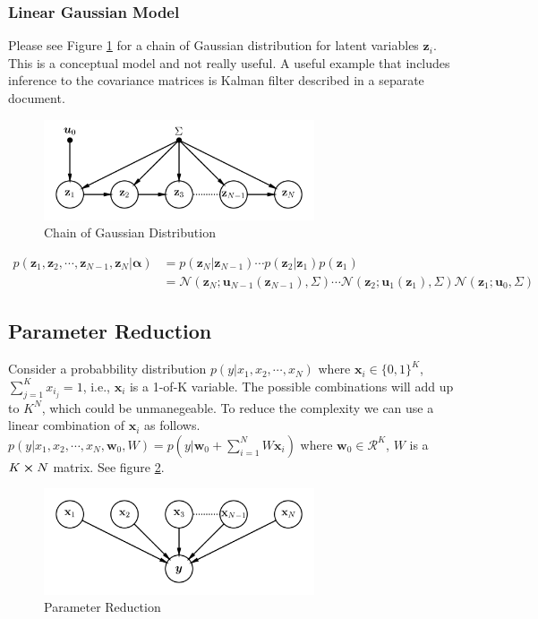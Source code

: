 \documentclass[a4]{article}
\begin{document}
\subsubsection{Linear Gaussian Model}
Please see Figure \ref{fig:chain_gaussian} for a chain of Gaussian distribution for latent variables $\bm{z}_i$.
This is a conceptual model and not really useful. A useful example that includes inference to the covariance matrices
is Kalman filter described in a separate document.
\begin{figure}[!htb]
\centering
\includegraphics[width=8cm]{chain_gaussian.png}
\caption{Chain of Gaussian Distribution}
\label{fig:chain_gaussian}
\end{figure}
\begin{equation}
\begin{aligned}
p(\bm{z}_1, \bm{z}_2, \cdots, \bm{z}_{N-1}, \bm{z}_{N} | \bm{\alpha}) &= 
p(\bm{z}_{N}|\bm{z}_{N-1})\cdots p(\bm{z}_{2}|\bm{z}_{1})p(\bm{z}_{1})\\
&=\mathcal{N}(\bm{z}_{N}; \bm{u}_{N-1}(\bm{z}_{N-1}), \Sigma)\cdots
\mathcal{N}(\bm{z}_{2}; \bm{u}_{1}(\bm{z}_{1}), \Sigma)
\mathcal{N}(\bm{z}_{1}; \bm{u}_{0}, \Sigma)
\end{aligned}
\end{equation}

\subsection{Parameter Reduction}
Consider a probabbility distribution $p(y|x_1, x_2, \cdots, x_N)$
where $\bm{x}_i \in \{0,1\}^K$, $\sum_{j=1}^K x_{i_j} = 1$, i.e., $\bm{x}_i$ is a 1-of-K variable.
The possible combinations will add up to $K^N$, which could be unmanegeable.
To reduce the complexity we can use a linear combination of $\bm{x}_i$ as follows.
$p(y|x_1, x_2, \cdots, x_N, \bm{w}_0, W) = p(y| \bm{w}_0 + \sum_{i=1}^N W\bm{x}_i)$
where $\bm{w}_0 \in \mathcal{R}^K$, $W$ is a $K \cross N$ matrix.
See figure \ref{fig:param_reduction}.

\begin{figure}[!htb]
\centering
\includegraphics[width=8cm]{param_reduction.png}
\caption{Parameter Reduction}
\label{fig:param_reduction}
\end{figure}
\end{document}
